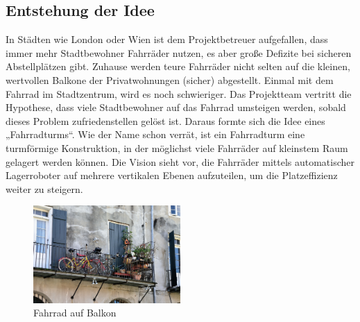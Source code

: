 \subsection{Entstehung der Idee}

In Städten wie London oder Wien ist dem Projektbetreuer aufgefallen, dass immer mehr Stadtbewohner Fahrräder nutzen, es aber große Defizite bei sicheren Abstellplätzen gibt. Zuhause werden teure Fahrräder nicht selten auf die kleinen, wertvollen Balkone der Privatwohnungen (sicher) abgestellt. Einmal mit dem Fahrrad im Stadtzentrum, wird es noch schwieriger. Das Projektteam vertritt die Hypothese, dass viele Stadtbewohner auf das Fahrrad umsteigen werden, sobald dieses Problem zufriedenstellen gelöst ist. Daraus formte sich die Idee eines „Fahrradturms“. Wie der Name schon verrät, ist ein Fahrradturm eine turmförmige Konstruktion, in der möglichst viele Fahrräder auf kleinstem Raum gelagert werden können. Die Vision sieht vor, die Fahrräder mittels automatischer Lagerroboter auf mehrere vertikalen Ebenen aufzuteilen, um die Platzeffizienz weiter zu steigern.

\begin{figure}[H]
  \begin{center}
    \includegraphics[width=0.5\textwidth]{images/fahrrad_balkon.jpg}
    \caption{Fahrrad auf Balkon }
    \label{fig:fahrrad_balkon}
  \end{center}
\end{figure}